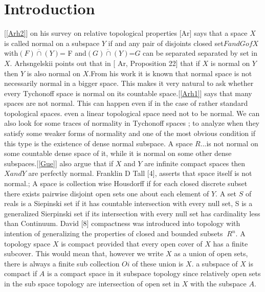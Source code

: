 \documentclass[PhD,14,a4paper]{report}
\theoremstyle{plain}
\theoremstyle{definition}
\theoremstyle{remark}
\numberwithin{figure}{section}
\numberwithin{equation}{subsection}
\begin{document}
{\section{Introduction}
[\ref{Arh2}] on his survey on relative topological properties [Ar] says that a space $X$ is called normal on a subspace $Y$ if and any pair of disjoints closed set$ F and G of X$ with$\overline{( F) \cap(Y)}$= F and$\overline{( G) \cap(Y)}$=$G$ can be separated separated by set in $X$. Arhsngelskii points out that in [ Ar, Proposition 22] that if $X$ is normal on $Y$ then $Y$ is also normal on $X$.From his work it is known that normal space is not necessarily normal in a bigger space. This makes it very natural to ask whether every Tychonoff space is normal on its countable space.[\ref{Arh1}] says that many spaces are not normal. This can happen even if in the case of rather standard topological spaces. even a linear topological space need not to be normal. We can also look for some traces of normality in Tychonoff spaces ; to analyze when they satisfy some weaker forms of  normality and one of the most obvious condition if this type is the existence of dense normal subspace. A space $R...$is not normal on some countable dense space of it, while it is normal on some other dense subspaces.[\ref{Gue}] also argue that if $X$ and $Y$ are infinite compact spaces then $X and Y$ are perfectly normal. Franklin D Tall [4], asserts that space itself is not normal.; A space is collection wise Housdorff if for each closed discrete subset  there exists pairwise disjoint open sets one about each element of $Y$. A set $S$ of reals is a Siepinski set  if it has countable intersection with every null set, S is a generalized Sierpinski set if its intersection with every null set has cardinality less than Continuum. David [8] compactness was introduced into topology with intention of generalizing the properties of closed and bounded subsets $\ R^n$. A topology space $X$ is compact provided that every open cover of $X$ has a finite subcover. This would mean that, however we write $X$ as a union of open sets, there is always a finite sub collection $Oi$ of these union is $X$. a subspace of $X$ is compact if $A$ is a compact space in it subspace topology since relatively open sets in the sub space topology are intersection of open set in $X$ with the subspace $A$.



}
\end{document}
